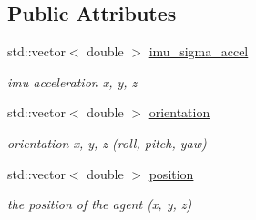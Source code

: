 \subsection*{Public Attributes}
\begin{DoxyCompactItemize}
\item 
std\+::vector$<$ double $>$ \hyperlink{classcontainers_1_1MissionChickenSoup_a52f8070421852b085217ac745924d3e1}{imu\+\_\+sigma\+\_\+accel}
\begin{DoxyCompactList}\small\item\em imu acceleration x, y, z \end{DoxyCompactList}\item 
std\+::vector$<$ double $>$ \hyperlink{classcontainers_1_1MissionChickenSoup_a7bd730ab45b8c76c0f8378cffeb98205}{orientation}
\begin{DoxyCompactList}\small\item\em orientation x, y, z (roll, pitch, yaw) \end{DoxyCompactList}\item 
std\+::vector$<$ double $>$ \hyperlink{classcontainers_1_1MissionChickenSoup_ac0c96514382b72a88f7e6f2e5e170082}{position}
\begin{DoxyCompactList}\small\item\em the position of the agent (x, y, z) \end{DoxyCompactList}\end{DoxyCompactItemize}
